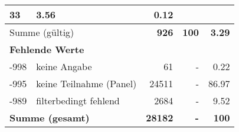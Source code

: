 \begin{longtable}{lXrrr}
       \num{33} &
       \num[round-mode=places,round-precision=2]{3.56} &
         \num[round-mode=places,round-precision=2]{0.12} \\
     \midrule
     \multicolumn{2}{l}{Summe (gültig)} &
       \textbf{\num{926}} &
     \textbf{\num{100}} &
       \textbf{\num[round-mode=places,round-precision=2]{3.29}} \\
     \multicolumn{5}{l}{\textbf{Fehlende Werte}}\\
       -998 &
       keine Angabe &
         \num{61} &
        - &
         \num[round-mode=places,round-precision=2]{0.22} \\
       -995 &
       keine Teilnahme (Panel) &
         \num{24511} &
        - &
         \num[round-mode=places,round-precision=2]{86.97} \\
       -989 &
       filterbedingt fehlend &
         \num{2684} &
        - &
         \num[round-mode=places,round-precision=2]{9.52} \\
     \midrule
     \multicolumn{2}{l}{\textbf{Summe (gesamt)}} &
          \textbf{\num{28182}} &
        \textbf{-} &
        \textbf{\num{100}} \\
     \bottomrule
     \end{longtable}
     
